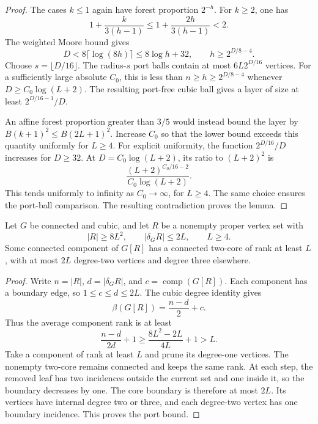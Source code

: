 \begin{proof}
The cases $k\le1$ again have forest proportion $2^{-h}$.
For $k\ge2$, one has
\[
 1+\frac{k}{3(h-1)}\le1+\frac{2h}{3(h-1)}<2.
\]
The weighted Moore bound gives
\[
 D<8\lceil\log(8h)\rceil\le8\log h+32,
 \qquad h\ge2^{D/8-4}.
\]
Choose $s=\lfloor D/16\rfloor$.
The radius-$s$ port balls contain at most $6L2^{D/16}$ vertices.
For a sufficiently large absolute $C_0$, this is less than
$n\ge h\ge2^{D/8-4}$ whenever $D\ge C_0\log(L+2)$.
The resulting port-free cubic ball gives a layer of size at least
$2^{D/16-1}/D$.

An affine forest proportion greater than $3/5$ would instead bound the layer by
$B(k+1)^2\le B(2L+1)^2$.
Increase $C_0$ so that the lower bound exceeds this quantity uniformly for $L\ge4$.
For explicit uniformity, the function $2^{D/16}/D$ increases for $D\ge32$.
At $D=C_0\log(L+2)$, its ratio to $(L+2)^2$ is
\[
 \frac{(L+2)^{C_0/16-2}}{C_0\log(L+2)}.
\]
This tends uniformly to infinity as $C_0\to\infty$, for $L\ge4$.
The same choice ensures the port-ball comparison.
The resulting contradiction proves the lemma.
\end{proof}

\begin{lemma}
\label{lem:path-clean-block-core}
Let $G$ be connected and cubic, and let $R$ be a nonempty proper vertex set with
\[
 |R|\ge8L^2,\qquad |\delta_G R|\le2L,\qquad L\ge4.
\]
Some connected component of $G[R]$ has a connected two-core of rank at least $L$, with at most $2L$ degree-two vertices and degree three elsewhere.
\end{lemma}

\begin{proof}
Write $n=|R|$, $d=|\delta_G R|$, and $c=\operatorname{comp}(G[R])$.
Each component has a boundary edge, so $1\le c\le d\le2L$.
The cubic degree identity gives
\[
 \beta(G[R])=\frac{n-d}{2}+c.
\]
Thus the average component rank is at least
\[
 \frac{n-d}{2d}+1
 \ge\frac{8L^2-2L}{4L}+1>L.
\]
Take a component of rank at least $L$ and prune its degree-one vertices.
The nonempty two-core remains connected and keeps the same rank.
At each step, the removed leaf has two incidences outside the current set and one inside it, so the boundary decreases by one.
The core boundary is therefore at most $2L$.
Its vertices have internal degree two or three, and each degree-two vertex has one boundary incidence.
This proves the port bound.
\end{proof}

